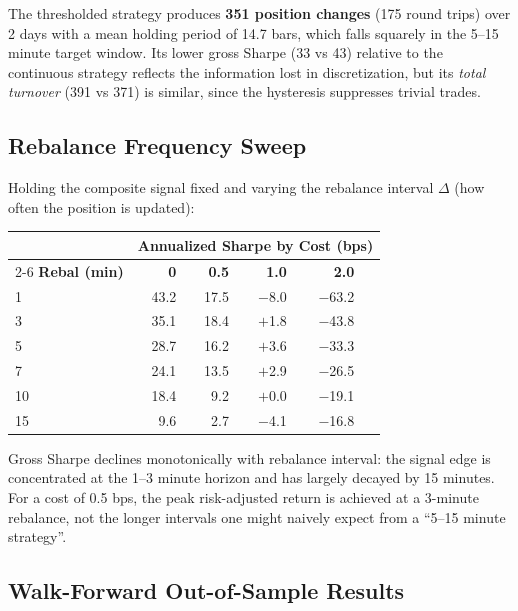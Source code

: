 \documentclass[11pt, a4paper]{article}
\begin{document}
The thresholded strategy produces \textbf{351 position changes} (175 round
trips) over 2 days with a mean holding period of 14.7 bars, which falls squarely
in the 5--15 minute target window.  Its lower gross Sharpe (33 vs 43) relative
to the continuous strategy reflects the information lost in discretization,
but its \textit{total turnover} (391 vs 371) is similar, since the hysteresis
suppresses trivial trades.

\subsection{Rebalance Frequency Sweep}

Holding the composite signal fixed and varying the rebalance interval
$\Delta$ (how often the position is updated):

\begin{center}
\begin{tabular}{lrrrrr}
\toprule
 & \multicolumn{5}{c}{\textbf{Annualized Sharpe by Cost (bps)}} \\
\cmidrule(lr){2-6}
\textbf{Rebal (min)} & \textbf{0} & \textbf{0.5} & \textbf{1.0} & \textbf{2.0} \\
\midrule
1  & 43.2 & 17.5 & $-$8.0  & $-$63.2 \\
3  & 35.1 & 18.4 & $+$1.8  & $-$43.8 \\
5  & 28.7 & 16.2 & $+$3.6  & $-$33.3 \\
7  & 24.1 & 13.5 & $+$2.9  & $-$26.5 \\
10 & 18.4 &  9.2 & $+$0.0  & $-$19.1 \\
15 &  9.6 &  2.7 & $-$4.1  & $-$16.8 \\
\bottomrule
\end{tabular}
\end{center}

Gross Sharpe declines monotonically with rebalance interval: the signal
edge is concentrated at the 1--3 minute horizon and has largely decayed
by 15 minutes.  For a cost of 0.5 bps, the peak risk-adjusted return is
achieved at a 3-minute rebalance, not the longer intervals one might naively
expect from a ``5--15 minute strategy''.

\subsection{Walk-Forward Out-of-Sample Results}
\end{document}
